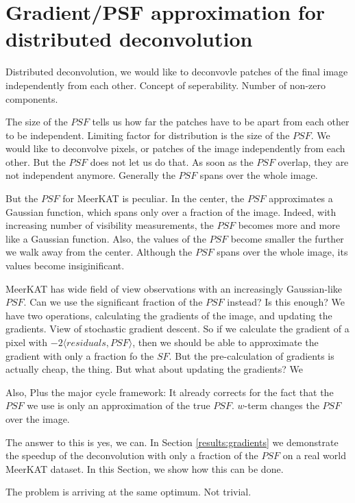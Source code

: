 \section{Gradient/PSF approximation for distributed deconvolution}

Distributed deconvolution, we would like to deconvovle patches of the final image independently from each other. 
Concept of seperability. Number of non-zero components.

The size of the $PSF$ tells us how far the patches have to be apart from each other to be independent.
Limiting factor for distribution is the size of the $PSF$. We would like to deconvolve pixels, or patches of the image independently from each other. But the $PSF$ does not let us do that. As soon as the $PSF$ overlap, they are not independent anymore.
Generally the $PSF$ spans over the whole image. 

But the $PSF$ for MeerKAT is peculiar.
In the center, the $PSF$ approximates a Gaussian function, which spans only over a fraction of the image. Indeed, with increasing number of visibility measurements, the $PSF$ becomes more and more like a Gaussian function.
Also, the values of the $PSF$ become smaller the further we walk away from the center. Although the $PSF$ spans over the whole image, its values become insiginificant.

MeerKAT has wide field of view observations with an increasingly Gaussian-like $PSF$. Can we use the significant fraction of the $PSF$ instead? Is this enough?
We have two operations, calculating the gradients of the image, and updating the gradients.
View of stochastic gradient descent. So if we calculate the gradient of a pixel with $-2 \langle residuals, PSF \rangle$, then we should be able to approximate the gradient with only a fraction fo the $SF$. But the pre-calculation of gradients is actually cheap, the thing. But what about updating the gradients?
We


Also,
Plus the major cycle framework: It already corrects for the fact that the $PSF$ we use is only an approximation of the true $PSF$. $w$-term changes the $PSF$ over the image. 



The answer to this is yes, we can. In Section \ref{results:gradients} we demonstrate the speedup of the deconvolution with only a fraction of the $PSF$ on a real world MeerKAT dataset. In this Section, we show how this can be done. 



The problem is arriving at the same optimum. Not trivial.



